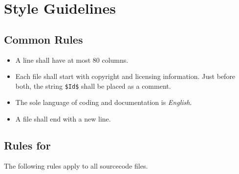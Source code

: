 %
%
%

\section{\CSOM Style Guidelines}
\label{sec:csom-style-guid}

\subsection{Common Rules}
\label{sec:common-rules}
\begin{itemize}
\item A line shall have at most 80 columns.
\item Each file shall start with copyright and licensing information.
  Just before both, the string \texttt{\$Id\$} shall be placed as a
  comment.
\item The sole language of coding and documentation is
  \emph{English}.
\item A file shall end with a new line.
\end{itemize}


\subsection{Rules for \C}
\label{sec:rules-c}

The following rules apply to all \C sourcecode files.

